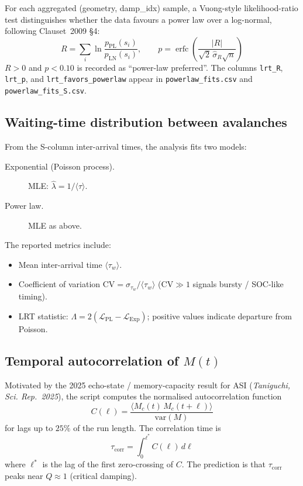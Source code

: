 \documentclass[11pt,a4paper]{article}
\newcommand{\file}[1]{\texttt{#1}}
\begin{document}
For each aggregated (geometry, damp\_idx) sample, a Vuong-style
likelihood-ratio test distinguishes whether the data favours a power law
over a log-normal, following Clauset~2009 \S4:
\[
  R = \sum_{i} \ln\frac{p_{\mathrm{PL}}(s_i)}{p_{\mathrm{LN}}(s_i)}, \qquad
  p = \operatorname{erfc}\!\left(\frac{|R|}{\sqrt{2}\,\hat{\sigma}_{R}\sqrt{n}}\right)
\]
$R > 0$ and $p < 0.10$ is recorded as ``power-law preferred''.  The columns
\texttt{lrt\_R}, \texttt{lrt\_p}, and \texttt{lrt\_favors\_powerlaw} appear in
\file{powerlaw\_fits.csv} and \file{powerlaw\_fits\_S.csv}.

\subsection{Waiting-time distribution between avalanches}
\label{sec:waiting_time}

From the S-column inter-arrival times, the analysis fits two models:

\begin{description}
  \item[Exponential (Poisson process).]  MLE: $\hat{\lambda} = 1/\langle\tau\rangle$.
  \item[Power law.]  MLE as above.
\end{description}

The reported metrics include:
\begin{itemize}
  \item Mean inter-arrival time $\langle\tau_w\rangle$.
  \item Coefficient of variation $\mathrm{CV} = \sigma_{\tau_w}/\langle\tau_w\rangle$
    ($\mathrm{CV} \gg 1$ signals bursty / SOC-like timing).
  \item LRT statistic: $\Lambda = 2(\mathcal{L}_{\mathrm{PL}} - \mathcal{L}_{\mathrm{Exp}})$;
    positive values indicate departure from Poisson.
\end{itemize}

\subsection{Temporal autocorrelation of $M(t)$}
\label{sec:autocorr}

Motivated by the 2025 echo-state / memory-capacity result for ASI
(\textit{Taniguchi, Sci. Rep.\ 2025}), the script computes the
normalised autocorrelation function
\begin{equation}
  C(\ell) = \frac{\langle M_c(t)\,M_c(t+\ell)\rangle}{\mathrm{var}(M)}
\end{equation}
for lags up to $25\%$ of the run length.  The correlation time is
\begin{equation}
  \tau_{\mathrm{corr}} = \int_0^{\ell^*} C(\ell)\,d\ell
\end{equation}
where $\ell^*$ is the lag of the first zero-crossing of $C$.
The prediction is that $\tau_{\mathrm{corr}}$ peaks near $Q \approx 1$
(critical damping).
\end{document}
